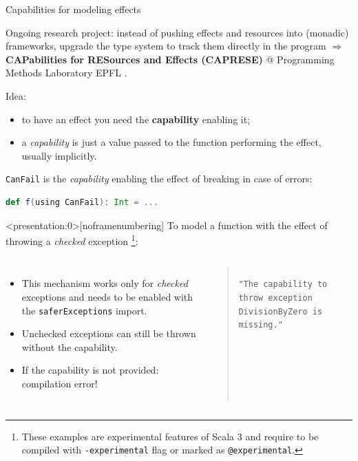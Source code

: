 \documentclass[aspectratio=1610,xcolor=dvipsnames]{beamer}
\begin{document}
%
\begin{frame}[fragile]{Capabilities for modeling effects}
  \begin{block}{}
    Ongoing research project: instead of pushing effects and resources into (monadic) frameworks, upgrade the type system to track them directly in the program $\Rightarrow$ \textbf{CAPabilities for RESources and Effects (CAPRESE)} @ Programming Methods Laboratory EPFL \cite{capabilities}.
  \end{block}
  Idea:
  \begin{itemize}
    \item to have an effect you need the \textbf{capability} enabling it;
    \item a \textit{capability} is just a value passed to the function performing the effect, usually implicitly.
  \end{itemize}
  \texttt{CanFail} is the \textit{capability} enabling the effect of breaking in case of errors:
  \begin{lstlisting}[language=scala, gobble=4]
    def f(using CanFail): Int = ...
  \end{lstlisting}
\end{frame}
%
\begin{frame}<presentation:0>[noframenumbering]
  \fontsize{8}{10}\selectfont
  To model a function with the effect of throwing a \textit{checked} exception
  \footnote{\tiny
    These examples are experimental features of Scala 3 and require to be compiled with \texttt{-experimental} flag or marked as \texttt{@experimental}.
  }:
  \begin{columns}
      
      \addtolength{\leftmargini}{\labelsep}
      \begin{itemize}
        \item This mechanism works only for \textit{checked} exceptions and needs to be enabled with the \texttt{saferExceptions} import.
        \item Unchecked exceptions can still be thrown without the capability.
        \item If the capability is not provided: compilation error!
      \end{itemize}
    \begin{quote}
      \texttt{"The capability to throw exception DivisionByZero is missing."}
    \end{quote}
  \end{columns}
\end{frame}
\end{document}
